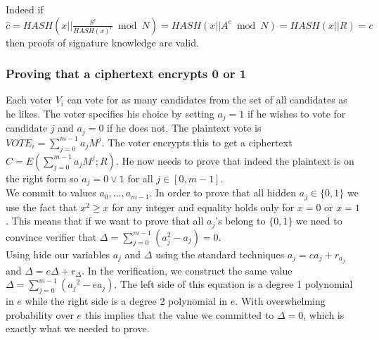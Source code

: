 \documentclass[12pt]{article}
\begin{document}
Indeed if $\hat{c} = HASH(x|| \frac{S^e}{HASH(x)^c}\bmod N )= HASH(x|| A^e\bmod N ) =  HASH(x||R) = c$ then proofs of signature knowledge are valid.
\subsubsection{Proving that a ciphertext encrypts 0 or 1}

Each voter $V_i$ can vote for as many candidates from the set of all candidates as he likes. The voter specifies his choice by setting $a_j = 1$ if he wishes to vote for candidate $j$ and $a_j = 0$ if he does not. The plaintext vote is $VOTE_i =\sum_{j=0}^{m-1}a_jM^j$. The voter encrypts this to get a ciphertext $C = E(\sum_{j=0}^{m-1}a_jM^j;R)$. He now needs to prove that indeed the plaintext is on the right form so $a_j = 0 \vee 1$ for all $j \in [0,m-1]$. \\

We commit to values $a_0, \dots , a_{m-1}$. In order to prove that all hidden $a_j \in \{0, 1\}$ we use the fact that $x^2 \geq x$ for any integer and equality holds only for $x = 0$ or $x = 1$. This means that if we want to prove that  all $a_j$'s belong to $\{0, 1\}$ we need to convince verifier that $\Delta = \sum_{j=0}^{m-1}(a_j^2  - a_j) = 0$.\\

 Using hide our variables $a_j$ and $\Delta$ using the standard techniques $\boxed{a_j} = ea_j +r_{a_j}$  and $\boxed{\Delta} = e\Delta+r_\Delta$. In the verification, we construct the same value $\boxed{\Delta} = \sum_{j=0}^{m-1}(\boxed{a_j}^2  - e\boxed{a_j})$. The left side of this equation  is a degree 1 polynomial in $e$ while the right side is a degree 2 polynomial in $e$. With overwhelming probability over $e$ this implies that the value we committed to $\Delta =0$, which is exactly what we needed to prove.\\
 
\end{document}

